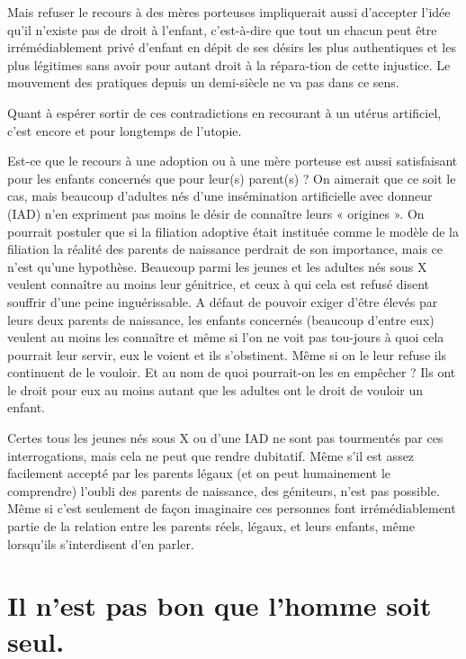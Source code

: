   Mais refuser le recours à des mères porteuses impliquerait aussi d'accepter l'idée qu'il n'existe pas de droit à l'enfant, c'est-à-dire que tout un chacun peut être irrémédiablement privé d'enfant en dépit de ses désirs les plus authentiques et les plus légitimes sans avoir pour autant droit à la répara-tion de cette injustice. Le mouvement des pratiques depuis un demi-siècle ne va pas dans ce sens.

Quant à espérer sortir de ces contradictions en recourant à un utérus artificiel, c'est encore et pour longtemps de l'utopie.

Est-ce que le recours à une adoption ou à une mère porteuse est aussi satisfaisant pour les enfants concernés que pour leur(s) parent(s) ? On aimerait que ce soit le cas, mais beaucoup d'adultes nés d'une insémination artificielle avec donneur (IAD) n’en expriment pas moins le désir de connaître leurs « origines ». On pourrait postuler que si la filiation adoptive était instituée comme le modèle de la filiation la réalité des parents de naissance perdrait de son importance, mais ce n'est qu'une hypothèse. Beaucoup parmi les jeunes et les adultes nés sous X veulent connaître au moins leur génitrice, et ceux à qui cela est refusé disent souffrir d'une peine inguérissable. A défaut de pouvoir exiger d'être élevés par leurs deux parents de naissance, les enfants concernés (beaucoup d'entre eux) veulent au moins les connaître et même si l'on ne voit pas tou-jours à quoi cela pourrait leur servir, eux le voient et ils s'obstinent. Même si on le leur refuse ils continuent de le vouloir. Et au nom de quoi pourrait-on les en empêcher ? Ils ont le droit pour eux au moins autant que les adultes ont le droit de vouloir un enfant.
 
 Certes tous les jeunes nés sous X ou d'une IAD ne sont pas tourmentés par ces interrogations, mais cela ne peut que rendre dubitatif. Même s'il est assez facilement accepté par les parents légaux (et on peut humainement le comprendre) l'oubli des parents de naissance, des géniteurs, n'est pas possible. Même si c'est seulement de façon imaginaire ces personnes font irrémédiablement partie de la relation entre les parents réels, légaux, et leurs enfants,  même lorsqu'ils s'interdisent d'en parler. 



\chapter{Il n'est pas bon que l'homme soit seul.} 

